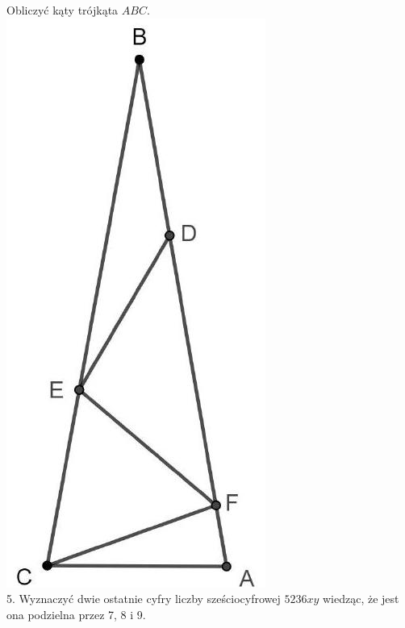 \documentclass[10pt]{article}
\begin{document}
Obliczyć kąty trójkąta \(A B C\).\\
\includegraphics[max width=\textwidth, center]{2024_11_21_74036bdc35e96c893761g-1}\\
5. Wyznaczyć dwie ostatnie cyfry liczby sześciocyfrowej \(5236 x y\) wiedząc, że jest ona podzielna przez 7, 8 i 9.
\end{document}
